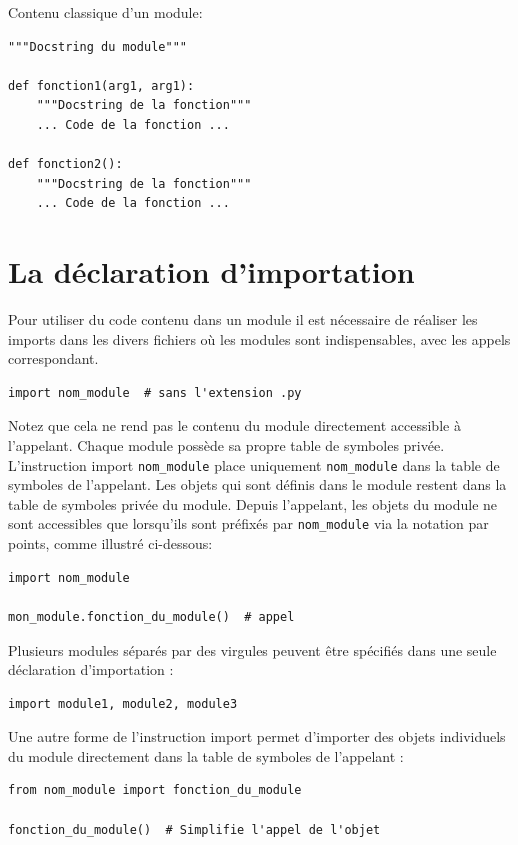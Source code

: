 \documentclass[a4paper,12pt]{book}
\begin{document}
Contenu classique d'un module:
\begin{lstlisting}
"""Docstring du module"""

def fonction1(arg1, arg1):
    """Docstring de la fonction"""
    ... Code de la fonction ...

def fonction2():
    """Docstring de la fonction"""
    ... Code de la fonction ...
\end{lstlisting}
\medskip

\section{La déclaration d'importation}
Pour utiliser du code contenu dans un module il est nécessaire de réaliser les imports dans les divers fichiers où les modules sont indispensables, avec les appels correspondant.
\begin{lstlisting}[caption=Import le plus classique]
import nom_module  # sans l'extension .py
\end{lstlisting}
\medskip

Notez que cela ne rend pas le contenu du module directement accessible à l'appelant. Chaque module possède sa propre table de symboles privée. L'instruction import \texttt{nom\_module} place uniquement \texttt{nom\_module} dans la table de symboles de l'appelant. Les objets qui sont définis dans le module restent dans la table de symboles privée du module. Depuis l'appelant, les objets du module ne sont accessibles que lorsqu'ils sont préfixés par \texttt{nom\_module} via la notation par points, comme illustré ci-dessous:
\begin{lstlisting}[caption=Appel d'un objet du module]
import nom_module  

mon_module.fonction_du_module()  # appel
\end{lstlisting}
\medskip

Plusieurs modules séparés par des virgules peuvent être spécifiés dans une seule déclaration d'importation :
\begin{lstlisting}[caption=Import de plusieurs modules]
import module1, module2, module3
\end{lstlisting}
\medskip

Une autre forme de l'instruction import permet d'importer des objets individuels du module directement dans la table de symboles de l'appelant :
\begin{lstlisting}[caption=Imports individualisés]
from nom_module import fonction_du_module

fonction_du_module()  # Simplifie l'appel de l'objet
\end{lstlisting}
\medskip
\end{document}
